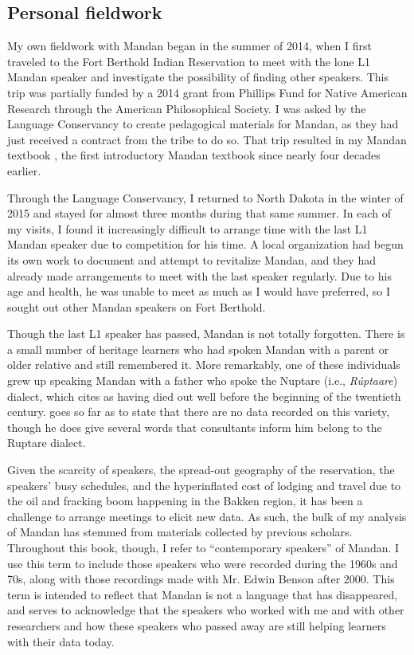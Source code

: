 \subsection{Personal fieldwork}

My own fieldwork with Mandan began in the summer of 2014, when I first traveled to the Fort Berthold Indian Reservation to meet with the lone L1 Mandan speaker and investigate the possibility of finding other speakers. This trip was partially funded by a 2014 grant from Phillips Fund for Native American Research through the American Philosophical Society. I was asked by the Language Conservancy to create pedagogical materials for Mandan, as they had just received a contract from the tribe to do so. That trip resulted in my Mandan textbook \citep{kasak2014}, the first introductory Mandan textbook since  nearly four decades earlier.

Through the Language Conservancy, I returned to North Dakota in the winter of 2015 and stayed for almost three months during that same summer. In each of my visits, I found it increasingly difficult to arrange time with the last L1 Mandan speaker due to competition for his time. A local organization had begun its own work to document and attempt to revitalize Mandan, and they had already made arrangements to meet with the last speaker regularly. Due to his age and health, he was unable to meet as much as I would have preferred, so I sought out other Mandan speakers on Fort Berthold.

Though the last L1 speaker has passed, Mandan is not totally forgotten. There is a small number of heritage learners who had spoken Mandan with a parent or older relative and still remembered it. More remarkably, one of these individuals grew up speaking Mandan with a father who spoke the Nuptare (i.e., \textit{Rúptaare}) dialect, which \citet[3]{mixco1997a} cites as having died out well before the beginning of the twentieth century. \citet[1]{hollow1970} goes so far as to state that there are no data recorded on this variety, though he does give several words that consultants inform him belong to the Ruptare dialect.

Given the scarcity of speakers, the spread-out geography of the reservation, the speakers' busy schedules, and the hyperinflated cost of lodging and travel due to the oil and fracking boom happening in the Bakken region, it has been a challenge to arrange meetings to elicit new data. As such, the bulk of my analysis of Mandan has stemmed from materials collected by previous scholars. Throughout this book, though, I refer to ``contemporary speakers'' of Mandan. I use this term to include those speakers who were recorded during the 1960s and 70s, along with those recordings made with Mr. Edwin Benson after 2000. This term is intended to reflect that Mandan is not a language that has disappeared, and serves to acknowledge that the speakers who worked with me and with other researchers and how these speakers who passed away are still helping learners with their data today.

